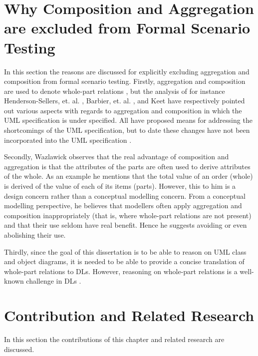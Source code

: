 \section{Why Composition and Aggregation are excluded from Formal Scenario Testing} \label{sec_Why Composition and Aggregation are excluded from Formal Scenario Testing}
In this section the reasons are discussed for explicitly excluding aggregation and composition from formal scenario testing. Firstly, aggregation and composition
 are used to denote whole-part relations \cite{Booch2007,ISO-UMLSuper2.4.1,Rumbaugh2005}, but 
 the analysis of for instance Henderson-Sellers, et. al. \cite{Henderson-Sellers1999}, Barbier, et. al. \cite{Barbier2003},
 and Keet \cite{Keet2006} have respectively pointed out various aspects with regards to aggregation and composition in which the UML specification is under specified.
 All have proposed means for addressing the shortcomings of the UML specification, but to date these changes have not been incorporated into the UML specification \cite{ISO-UMLSuper2.4.1}.
 
 Secondly, Wazlawick \cite{Wazlawick2014} observes that the real advantage of composition and aggregation is that the attributes of the parts are often used to derive attributes of the whole. As an example 
 he mentions that the total value of an order (whole) is derived of the value of each of its items (parts). However, this to him is a design concern rather than a conceptual modelling concern.
 From a conceptual modelling perspective, he believes that modellers often apply aggregation and composition inappropriately (that is, where whole-part relations 
 are not present) and that their use seldom have real benefit.
 Hence he suggests avoiding or even abolishing their use. 
 
 Thirdly, since the goal of this dissertation is to be able to reason on UML class and object
 diagrams, it is needed to be able to provide a concise translation of whole-part relations to DLs. 
 However, reasoning on whole-part relations is a well-known challenge in DLs \cite{Bittner2005,Keet2012,Schroder2008}.

\section{Contribution and Related Research} \label{sec_DLTranslationFormalScenrioTesting Contribution and Related Research}
In this section the contributions of this chapter and related research are discussed.

